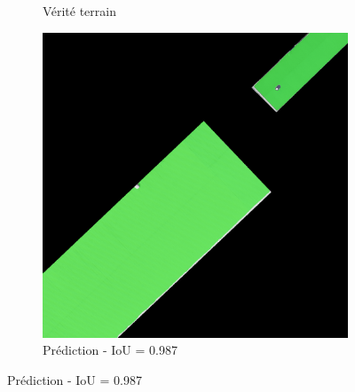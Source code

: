 \begin{figure}[H]
\begin{subfigure}{0.32\textwidth}
    \caption{Vérité terrain}
\end{subfigure}
\hfill
\begin{subfigure}{0.32\textwidth}
    \includegraphics[width=\textwidth]{02-main//figures/ch4/kfold_ensembles/upernet_tu-efficientnetv2_rw_s.ra2_in1k/best_cases/best_4_iou0.987_24961121_tile_15_10_cc6553_overlay_pred.png}
    \caption{Prédiction - IoU = 0.987}
\end{subfigure}

\vspace{0.35cm}


\end{figure}
